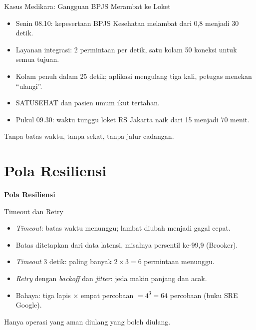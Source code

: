 \documentclass[aspectratio=169, table, 12pt]{beamer}
\begin{document}
\begin{frame}{{\Large Kasus Medikara: Gangguan BPJS Merambat ke Loket}}
  \vspace{6pt}
  \small
  \begin{itemize}
    \item Senin 08.10: kepesertaan BPJS Kesehatan melambat dari 0,8 menjadi 30 detik.
    \item Layanan integrasi: 2 permintaan per detik, satu kolam 50 koneksi untuk semua tujuan.
    \item Kolam penuh dalam 25 detik; aplikasi mengulang tiga kali, petugas menekan ``ulangi''.
    \item SATUSEHAT dan pasien umum ikut tertahan.
    \item Pukul 09.30: waktu tunggu loket RS Jakarta naik dari 15 menjadi 70 menit.
  \end{itemize}
  \vspace{4pt}
  {\small Tanpa batas waktu, tanpa sekat, tanpa jalur cadangan.}
\end{frame}

\section{Pola Resiliensi}

\begin{frame}{\hfill}
  \centering
  \Huge{\textbf{Pola Resiliensi}}
\end{frame}

\begin{frame}{{\Large Timeout dan Retry}}
  \vspace{6pt}
  \small
  \begin{itemize}
    \item \textit{Timeout}: batas waktu menunggu; lambat diubah menjadi gagal cepat.
    \item Batas ditetapkan dari data latensi, misalnya persentil ke-99,9 (Brooker).
    \item \textit{Timeout} 3 detik: paling banyak $2 \times 3 = 6$ permintaan menunggu.
    \item \textit{Retry} dengan \textit{backoff} dan \textit{jitter}: jeda makin panjang dan acak.
    \item Bahaya: tiga lapis $\times$ empat percobaan $= 4^3 = 64$ percobaan (buku SRE Google).
  \end{itemize}
  \vspace{4pt}
  {\small Hanya operasi yang aman diulang yang boleh diulang.}
\end{frame}
\end{document}
